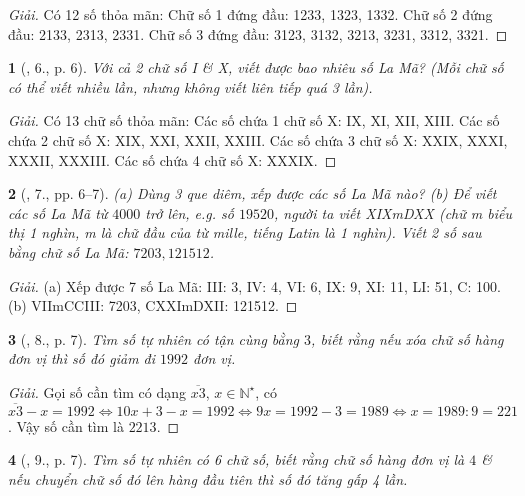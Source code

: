 \documentclass{article}
\newtheorem{baitoan}{}
\begin{document}
\begin{proof}[Giải]
	Có 12 số thỏa mãn: Chữ số 1 đứng đầu: 1233, 1323, 1332. Chữ số 2 đứng đầu: 2133, 2313, 2331. Chữ số 3 đứng đầu: 3123, 3132, 3213, 3231, 3312, 3321.
\end{proof}

\begin{baitoan}[\cite{Binh_Toan_6_tap_1}, 6., p. 6]
	Với cả 2 chữ số {\rm I} \& {\rm X}, viết được bao nhiêu số La Mã? (Mỗi chữ số có thể viết nhiều lần, nhưng không viết liên tiếp quá 3 lần).
\end{baitoan}

\begin{proof}[Giải]
	Có 13 chữ số thỏa mãn: Các số chứa 1 chữ số X: IX, XI, XII, XIII. Các số chứa 2 chữ số X: XIX, XXI, XXII, XXIII. Các số chứa 3 chữ số X: XXIX, XXXI, XXXII, XXXIII. Các số chứa 4 chữ số X: XXXIX.
\end{proof}

\begin{baitoan}[\cite{Binh_Toan_6_tap_1}, 7., pp. 6--7]
	(a) Dùng 3 que diêm, xếp được các số La Mã nào? (b) Để viết các số La Mã từ $4000$ trở lên, e.g. số $19520$, người ta viết {\rm XIXmDXX} (chữ {\rm m} biểu thị \emph{1 nghìn}, m là chữ đầu của từ \emph{mille}, tiếng Latin là 1 nghìn). Viết 2 số sau bằng chữ số La Mã: $7203, 121512$.
\end{baitoan}

\begin{proof}[Giải]
	(a) Xếp được 7 số La Mã: III: 3, IV: 4, VI: 6, IX: 9, XI: 11, LI: 51, C: 100. (b) VIImCCIII: 7203, CXXImDXII: 121512.
\end{proof}

\begin{baitoan}[\cite{Binh_Toan_6_tap_1}, 8., p. 7]
	Tìm số tự nhiên có tận cùng bằng $3$, biết rằng nếu xóa chữ số hàng đơn vị thì số đó giảm đi $1992$ đơn vị.
\end{baitoan}

\begin{proof}[Giải]
	Gọi số cần tìm có dạng $\overline{x3}$, $x\in\mathbb{N}^\star$, có $\overline{x3} - x = 1992\Leftrightarrow10x + 3 - x = 1992\Leftrightarrow9x = 1992 - 3 = 1989\Leftrightarrow x = 1989:9 = 221$. Vậy số cần tìm là $2213$.
\end{proof}

\begin{baitoan}[\cite{Binh_Toan_6_tap_1}, 9., p. 7]
	Tìm số tự nhiên có 6 chữ số, biết rằng chữ số hàng đơn vị là $4$ \& nếu chuyển chữ số đó lên hàng đầu tiên thì số đó tăng gấp 4 lần.
\end{baitoan}
\end{document}

